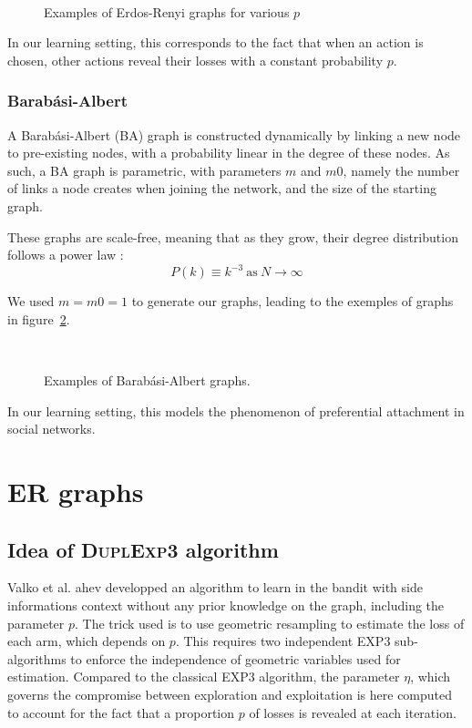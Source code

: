 \documentclass[10pt,a4paper]{scrartcl}
\begin{document}
\begin{figure}
 ~
 \label{er_ex}
 \caption{Examples of Erdos-Renyi graphs for various $p$}
\end{figure}

In our learning setting, this corresponds to the fact that when an action is chosen, other actions reveal their losses with a constant probability $p$.

\subsubsection{Barabási-Albert}
A Barabási-Albert (BA) graph is constructed dynamically by linking a new node to pre-existing nodes, with a probability linear in the degree of these nodes. As such, a BA graph is parametric, with parameters $m$ and $m0$, namely the number of links a node creates when joining the network, and the size of the starting graph.

These graphs are scale-free, meaning that as they grow, their degree distribution follows a power law :
$$P(k) \equiv k^{-3}~\text{as}~N\rightarrow \infty$$

We used $m=m0=1$ to generate our graphs, leading to the exemples of graphs in figure~\ref{ba_ex}.

\begin{figure}
 ~
 \label{ba_ex}
 \caption{Examples of Barabási-Albert graphs.}
\end{figure}

In our learning setting, this models the phenomenon of preferential attachment in social networks.

\section{ER graphs}
\subsection{Idea of \textsc{DuplExp3} algorithm}
Valko et al. ahev developped an algorithm to learn in the bandit with side informations context without any prior knowledge on the graph, including the parameter $p$. The trick used is to use geometric resampling to estimate the loss of each arm, which depends on $p$. This requires two independent EXP3 sub-algorithms to enforce the independence of geometric variables used for estimation. Compared to the classical EXP3 algorithm, the parameter $\eta$, which governs the compromise between exploration and exploitation is here computed to account for the fact that a proportion $p$ of losses is revealed at each iteration.
\end{document}
